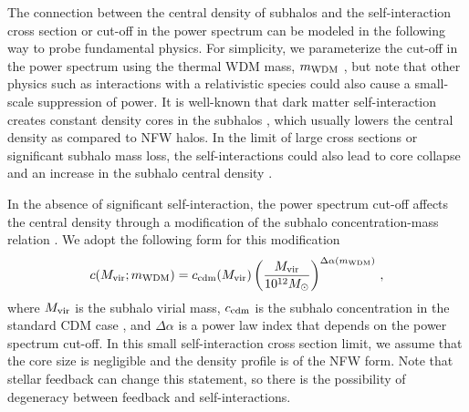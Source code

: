 The connection between the central density of subhalos and the self-interaction cross section or cut-off in the power spectrum can be modeled in the following way to probe fundamental physics. For simplicity, we parameterize the cut-off in the power spectrum using the thermal WDM mass, $m_{\rm WDM}$ \citep[\eg,][]{Bode:2000gq}, but note that other physics such as interactions with a relativistic species \citep[\eg,][]{Boehm:2004th,Cyr-Racine:2015ihg} could also cause a small-scale suppression of power. It is well-known that dark matter self-interaction creates constant density cores in the subhalos \citep{Spergel:1999mh}, which usually lowers the central density as compared to NFW halos. In the limit of large cross sections or significant subhalo mass loss, the self-interactions could also lead to core collapse and an increase in the subhalo central density \citep{Balberg:2002ue,Ahn:2004xt,Nishikawa:2019lsc}. 

In the absence of significant self-interaction, the power spectrum cut-off affects the central density through a modification of the subhalo concentration-mass relation \citep{Dunstan:2011bq,schneider2012,Lovell:2013ola,Bose:2016irl}. We adopt the following form for this modification  
\begin{equation}
c(M_{\rm vir}; m_{\rm WDM}) = c_{\rm cdm}(M_{\rm vir})\left(\frac{M_{\rm vir}}{10^{12} M_\odot} \right)^{\Delta\alpha(m_{\rm WDM})}\,,
\end{equation}
where $M_{\rm vir}$ is the subhalo virial mass, $c_{\rm cdm}$ is the subhalo concentration in the standard CDM case \citep{Moline:2016pbm}, and $\Delta\alpha$ is a power law index that depends on the power spectrum cut-off. In this small self-interaction cross section limit, we assume that the core size is negligible and the density profile is of the NFW form. Note that stellar feedback can change this statement, so there is the possibility of degeneracy between feedback and self-interactions. 

